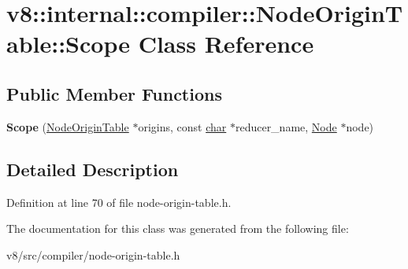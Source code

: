 \hypertarget{classv8_1_1internal_1_1compiler_1_1NodeOriginTable_1_1Scope}{}\section{v8\+:\+:internal\+:\+:compiler\+:\+:Node\+Origin\+Table\+:\+:Scope Class Reference}
\label{classv8_1_1internal_1_1compiler_1_1NodeOriginTable_1_1Scope}
\subsection*{Public Member Functions}
\begin{DoxyCompactItemize}
\item 
\mbox{\label{classv8_1_1internal_1_1compiler_1_1NodeOriginTable_1_1Scope_ae6dc2cb59a84d1f043b9781bcabe3013}} 
{\bfseries Scope} (\mbox{\hyperlink{classv8_1_1internal_1_1compiler_1_1NodeOriginTable}{Node\+Origin\+Table}} $\ast$origins, const \mbox{\hyperlink{classchar}{char}} $\ast$reducer\+\_\+name, \mbox{\hyperlink{classv8_1_1internal_1_1compiler_1_1Node}{Node}} $\ast$node)
\end{DoxyCompactItemize}


\subsection{Detailed Description}


Definition at line 70 of file node-\/origin-\/table.\+h.



The documentation for this class was generated from the following file\+:\begin{DoxyCompactItemize}
\item 
v8/src/compiler/node-\/origin-\/table.\+h\end{DoxyCompactItemize}
